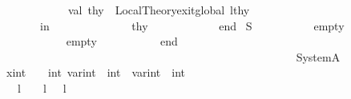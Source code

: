 \begin{isabellebody}
\ \ \ \ \ \ \ \ \ \ \ \ \ \ val\ thy{\isacharprime}{\kern0pt}{\isacharprime}{\kern0pt}\ {\isacharequal}{\kern0pt}\ Local{\isacharunderscore}{\kern0pt}Theory{\isachardot}{\kern0pt}exit{\isacharunderscore}{\kern0pt}global\ lthy{\isacharprime}{\kern0pt}\isanewline
\ \ \ \ \ \ \ \ \ \ \ \ \ \ \ \ \ \isanewline
\ \ \ \ \ \ \ \ \ in\isanewline
\ \ \ \ \ \ \ \ \ \ \ \ \ \ thy{\isacharprime}{\kern0pt}{\isacharprime}{\kern0pt}\isanewline
\ \ \ \ \ \ \ \ \ \ \ \ end{\isacharparenright}{\kern0pt}{\isacharparenright}{\kern0pt}{\isacharparenright}{\kern0pt}\isanewline
{\isacartoucheclose}%
\endisatagML
{\isafoldML}%
%
\isadelimML
%
\endisadelimML
%
\isadelimdocument
%
\endisadelimdocument
%
\isatagdocument
%
\isamarkuptrue%
%
\endisatagdocument
{\isafolddocument}%
%
\isadelimdocument
%
\endisadelimdocument
{}\isamarkupfalse%
\ S\isanewline
\ \ \ \isanewline
\ \ \ \isanewline
\ \ \ empty{\isacharcolon}{\kern0pt}\isanewline
\ \ \ \ \ \ \ \ \ \ \isanewline
\ \ \ empty{}{\isacharcolon}{\kern0pt}\isanewline
\ \ \ \ \ \ \ \ \ \ \isanewline
end{\isacharsemicolon}{\kern0pt}\isanewline
\ \ \ \ \ \ \ \ \ \ \ \ \ \ \ \ \ \ \ \ \ \ \ \ \ \ \ \ \ \ \ \ \ \ \ \ \ \ \ \ \ \ \ \ \ \ \ \ \ \ \ \ \ \isanewline
\isanewline
{}\isamarkupfalse%
\ System{\isacharunderscore}{\kern0pt}A\isanewline
\ \ \ x{\isacharcolon}{\kern0pt}{\isacartoucheopen}int{\isacartoucheclose}\ {\isacharequal}{\kern0pt}\ {\isacartoucheopen}{}\ {\isacharcolon}{\kern0pt}{\isacharcolon}{\kern0pt}\ int{\isacartoucheclose}\ var{}{\isacharcolon}{\kern0pt}{\isacartoucheopen}int{\isacartoucheclose}\ {\isacharequal}{\kern0pt}\ {\isacartoucheopen}{}{\isacharcolon}{\kern0pt}{\isacharcolon}{\kern0pt}int{\isacartoucheclose}\ \ var{}{\isacharcolon}{\kern0pt}{\isacartoucheopen}int{\isacartoucheclose}\ {\isacharequal}{\kern0pt}\ {\isacartoucheopen}{}{\isacharcolon}{\kern0pt}{\isacharcolon}{\kern0pt}int{\isacartoucheclose}\isanewline
\ \ \ \ \ l{\isacharcolon}{\kern0pt}{\isacartoucheopen}{\isacharparenleft}{\kern0pt}{\isacharparenright}{\kern0pt}{\isacartoucheclose}\ \ \ \ l{}{\isacharcolon}{\kern0pt}{\isacartoucheopen}{\isacharparenleft}{\kern0pt}{\isacharparenright}{\kern0pt}{\isacartoucheclose}\ \ \ l{}{\isacharcolon}{\kern0pt}{\isacartoucheopen}{\isacharparenleft}{\kern0pt}{\isacharparenright}{\kern0pt}{\isacartoucheclose}\ \ \ \ \ \ \ \ \ \ \ \ \ \ \ \ \ \ \ \ \ \ \ \ \ \ \ \ \ \ \ \ \isanewline

\end{isabellebody}
